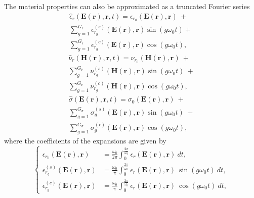 The material properties can also be approximated as a truncated Fourier series \cite{copeland2010domain}
%
\begin{multline} \label{eq:matfourier}
\hat{{\epsilon}}_r(\mathbf{E}(\mathbf{r}), \mathbf{r}, t) = {\epsilon}_{r_0}(\mathbf{E}(\mathbf{r}),\mathbf{r}) \ + \\
\sum^{G_\epsilon}_{g=1} {\epsilon}_{r_g}^{(s)}(\mathbf{E}(\mathbf{r}),\mathbf{r}) \sin(g \omega_0 t) + \ \\ \sum^{G_\epsilon}_{g=1}  {\epsilon}_{r_g}^{(c)}(\mathbf{E}(\mathbf{r}),\mathbf{r}) \cos(g \omega_0 t),
\end{multline} 
\begin{multline} 
\hat{{\nu}}_r(\mathbf{H}(\mathbf{r}), \mathbf{r}, t) = {\nu}_{r_0}(\mathbf{H}(\mathbf{r}),\mathbf{r}) \ + \\ \sum^{G_\nu}_{g=1}  {\nu}_{r_g}^{(s)}(\mathbf{H}(\mathbf{r}),\mathbf{r}) \sin(g \omega_0 t) \ + \\
 \sum^{G_\nu}_{g=1} {\nu}_{r_g}^{(c)}(\mathbf{H}(\mathbf{r}),\mathbf{r}) \cos(g \omega_0 t),
\end{multline} 
\begin{multline} 
\hat{{\sigma}}(\mathbf{E}(\mathbf{r}), \mathbf{r}, t) = {\sigma}_{0}(\mathbf{E}(\mathbf{r}),\mathbf{r}) \ + \\
\sum^{G_\sigma}_{g=1} {\sigma}_{g}^{(s)}(\mathbf{E}(\mathbf{r}),\mathbf{r}) \sin(g \omega_0 t) \ + \\
\sum^{G_\sigma}_{g=1} {\sigma}_{g}^{(c)} (\mathbf{E}(\mathbf{r}),\mathbf{r}) \cos(g \omega_0 t),
\end{multline}
where the coefficients of the expansions are given by
\begin{equation}
\left\{
\begin{aligned} \label{eq:epsCoeffs}
{\epsilon}_{r_{0}}(\mathbf{E}(\mathbf{r}),\mathbf{r}) &= \frac{\omega_0}{2\pi}\int_0^{\frac{2\pi}{\omega_0}}
{\epsilon}_r(\mathbf{E}(\mathbf{r}),\mathbf{r}) \ dt, \\[.5cm]
{\epsilon}_{r_{g}}^{(s)}(\mathbf{E}(\mathbf{r}),\mathbf{r}) &=  \frac{\omega_0}{\pi}\int_0^{\frac{2\pi}{\omega_0}}
{\epsilon}_r(\mathbf{E}(\mathbf{r}),\mathbf{r}) \ \sin(g \omega_0 t) \ dt, \\[.5cm]
{\epsilon}_{r_{g}}^{(c)}(\mathbf{E}(\mathbf{r}),\mathbf{r}) &=  \frac{\omega_0}{\pi}\int_0^{\frac{2\pi}{\omega_0}} 
{\epsilon}_r(\mathbf{E}(\mathbf{r}),\mathbf{r}) \ \cos(g \omega_0 t) \ dt,
\end{aligned}
\right.
\end{equation}
